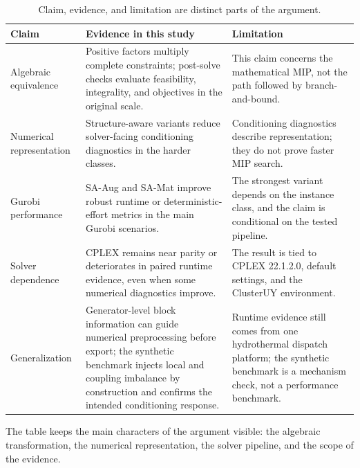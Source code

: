 \documentclass[AMA,Times1COL]{WileyNJDv5} %
\newcommand{\methodAug}{SA-Aug}
\newcommand{\methodMat}{SA-Mat}
\providecommand{\DIFaddbegin}{} %
\providecommand{\DIFaddend}{} %
\providecommand{\DIFdelend}{} %
\begin{document}
\DIFdelend \DIFaddbegin \begin{table}[t]
\centering
\caption{Claim, evidence, and limitation are distinct parts of the argument.}
\label{tab:claim-summary}
\begin{threeparttable}
\small
\begin{tabular}{@{}p{}p{}p{}@{}}
\toprule
Claim & Evidence in this study & Limitation \\
\midrule
Algebraic equivalence & Positive factors multiply complete constraints; post-solve checks evaluate feasibility, integrality, and objectives in the original scale. & This claim concerns the mathematical MIP, not the path followed by branch-and-bound. \\
Numerical representation & Structure-aware variants reduce solver-facing conditioning diagnostics in the harder classes. & Conditioning diagnostics describe representation; they do not prove faster MIP search. \\
Gurobi performance & \methodAug{} and \methodMat{} improve robust runtime or deterministic-effort metrics in the main Gurobi scenarios. & The strongest variant depends on the instance class, and the claim is conditional on the tested pipeline. \\
Solver dependence & CPLEX remains near parity or deteriorates in paired runtime evidence, even when some numerical diagnostics improve. & The result is tied to CPLEX 22.1.2.0, default settings, and the ClusterUY environment. \\
Generalization & Generator-level block information can guide numerical preprocessing before export; the synthetic benchmark injects local and coupling imbalance by construction and confirms the intended conditioning response. & Runtime evidence still comes from one hydrothermal dispatch platform; the synthetic benchmark is a mechanism check, not a performance benchmark. \\
\bottomrule
\end{tabular}
\begin{tablenotes}[flushleft]\footnotesize
\item The table keeps the main characters of the argument visible: the algebraic
transformation, the numerical representation, the solver pipeline, and the scope of the
evidence.
\end{tablenotes}
\end{threeparttable}
\end{table}
\DIFaddend 
\end{document}
